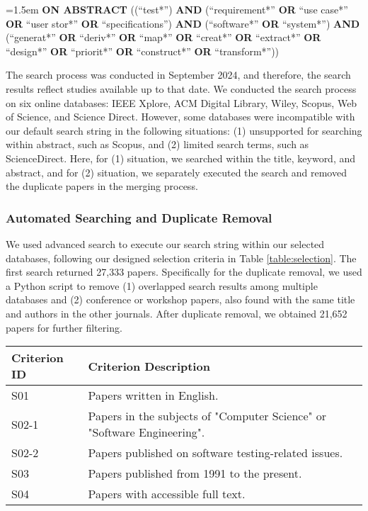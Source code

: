 \hangindent=1.5em
 \textbf{ON ABSTRACT} ((``test*'') \textbf{AND} (``requirement*'' \textbf{OR} ``use case*'' \textbf{OR} ``user stor*'' \textbf{OR} ``specifications'') \textbf{AND} (``software*'' \textbf{OR} ``system*'') \textbf{AND} (``generat*'' \textbf{OR} ``deriv*'' \textbf{OR} ``map*'' \textbf{OR} ``creat*'' \textbf{OR} ``extract*'' \textbf{OR} ``design*'' \textbf{OR} ``priorit*'' \textbf{OR} ``construct*'' \textbf{OR} ``transform*''))

The search process was conducted in September 2024, and therefore, the search results reflect studies available up to that date. We conducted the search process on six online databases: IEEE Xplore, ACM Digital Library, Wiley, Scopus, Web of Science, and Science Direct. However, some databases were incompatible with our default search string in the following situations: (1) unsupported for searching within abstract, such as Scopus, and (2) limited search terms, such as ScienceDirect. Here, for (1) situation, we searched within the title, keyword, and abstract, and for (2) situation, we separately executed the search and removed the duplicate papers in the merging process. 

\subsubsection{Automated Searching and Duplicate Removal}
We used advanced search to execute our search string within our selected databases, following our designed selection criteria in Table \ref{table:selection}. The first search returned 27,333 papers. Specifically for the duplicate removal, we used a Python script to remove (1) overlapped search results among multiple databases and (2) conference or workshop papers, also found with the same title and authors in the other journals. After duplicate removal, we obtained 21,652 papers for further filtering.

\begin{table*}[]
\caption{Selection Criteria}
\label{table:selection}
\begin{tabularx}{\textwidth}{lX}
\hline
\textbf{Criterion ID} & \textbf{Criterion Description} \\ \hline
S01          & Papers written in English. \\
S02-1        & Papers in the subjects of "Computer Science" or "Software Engineering". \\
S02-2        & Papers published on software testing-related issues. \\
S03          & Papers published from 1991 to the present. \\ 
S04          & Papers with accessible full text. \\ \hline
\end{tabularx}
\end{table*}

